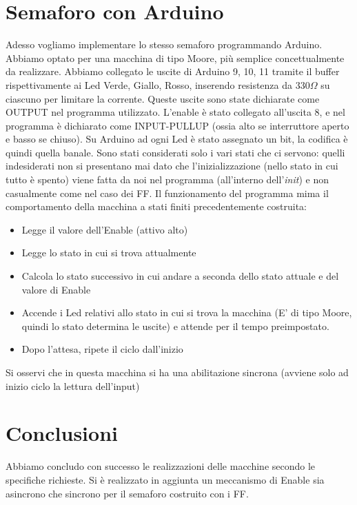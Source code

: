 \documentclass[10pt,a4paper]{article}
\begin{document}
\section{Semaforo con Arduino}
Adesso vogliamo implementare lo stesso semaforo programmando Arduino. Abbiamo optato per una macchina di tipo Moore, più semplice concettualmente da realizzare.
Abbiamo collegato le uscite di Arduino 9, 10, 11 tramite il buffer rispettivamente ai Led Verde, Giallo, Rosso, inserendo resistenza da $330\Omega$ su ciascuno per limitare la corrente.
Queste uscite sono state dichiarate come OUTPUT nel programma utilizzato.
L'enable è stato collegato all'uscita 8, e nel programma è dichiarato come INPUT-PULLUP (ossia alto se interruttore aperto e basso se chiuso).
Su Arduino ad ogni Led è stato assegnato un bit, la codifica è quindi quella banale. Sono stati considerati solo i vari stati che ci servono: quelli indesiderati non si presentano mai dato che l'inizializzazione (nello stato in cui tutto è spento) viene fatta da noi nel programma (all'interno dell'\emph{init}) e non casualmente come nel caso dei FF.
Il funzionamento del programma mima il comportamento della macchina a stati finiti precedentemente costruita:
\begin{itemize}
\item Legge il valore dell'Enable (attivo alto)
\item Legge lo stato in cui si trova attualmente
\item Calcola lo stato successivo in cui andare a seconda dello stato attuale e del valore di Enable
\item Accende i Led relativi allo stato in cui si trova la macchina (E' di tipo Moore, quindi lo stato determina le uscite) e attende per il tempo preimpostato.
\item Dopo l'attesa, ripete il ciclo dall'inizio
\end{itemize}
Si osservi che in questa macchina si ha una abilitazione sincrona (avviene solo ad inizio ciclo la lettura dell'input)

\section{Conclusioni}
Abbiamo concludo con successo le realizzazioni delle macchine secondo le specifiche richieste. Si è realizzato in aggiunta un meccanismo di Enable sia asincrono che sincrono per il semaforo costruito con i FF.
\end{document}
